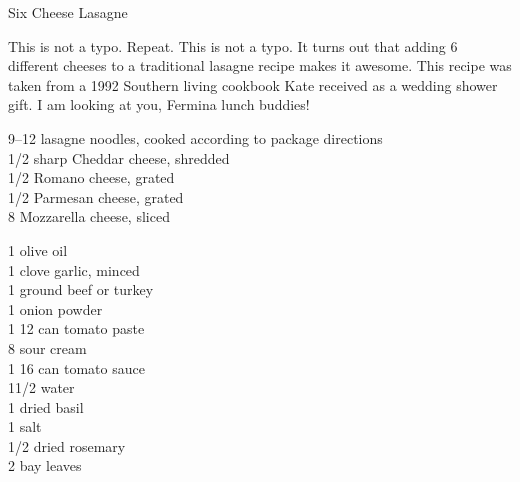\begin{entry}{Six Cheese Lasagne}

\begin{open}
  This is not a typo. Repeat. This is not a typo. It turns out that adding 6
  different cheeses to a traditional lasagne recipe makes it awesome. This
  recipe was taken from a 1992 Southern living cookbook Kate received as a
  wedding shower gift. I am looking at you, Fermina lunch buddies!
\end{open}

\begin{ingredients}
\numrange{9}{12} lasagne noodles, cooked according to package directions\\
\SI{1/2}{\cup} sharp Cheddar cheese, shredded\\
\SI{1/2}{\cup} Romano cheese, grated\\
\SI{1/2}{\cup} Parmesan cheese, grated \\
\SI{8}{\ounce} Mozzarella cheese, sliced
\end{ingredients}

\begin{ingredients}
    \SI{1}{\tblspoon} olive oil\\
    1 clove garlic, minced\\
    \SI{1}{\ounce} ground beef or turkey \\
    \SI{1}{\teaspoon} onion powder\\
    1 \SI{12}{\ounce} can tomato paste\\
    \SI{8}{\ounce} sour cream\\
    1 \SI{16}{\ounce} can tomato sauce\\
    1\SI{1/2}{\cup} water\\
    \SI{1}{\tblspoon} dried basil\\
    \SI{1}{\teaspoon} salt\\
    \SI{1/2}{\teaspoon} dried rosemary\\
    2 bay leaves
\end{ingredients}


\end{entry}
